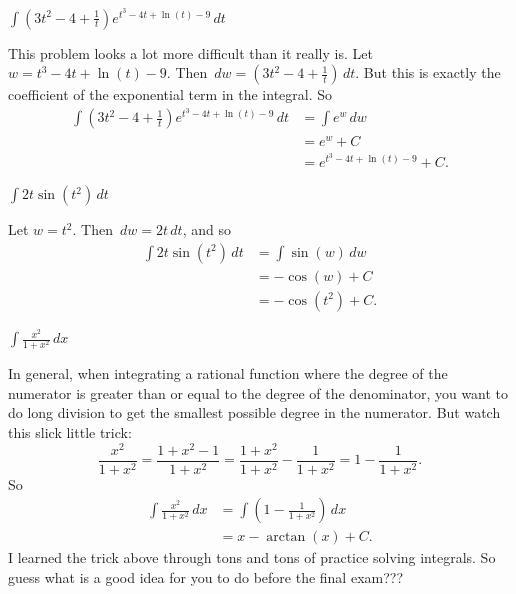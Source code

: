 \documentclass[nooutcomes]{ximera}
\renewenvironment{freeResponse}{
\ifhandout\setbox0\vbox\bgroup\else
\begin{trivlist}\item[\hskip \labelsep\bfseries Solution:\hspace{2ex}]
\fi}
{\ifhandout\egroup\else
\end{trivlist}
\fi}
\renewcommand{\d}{\,d}
\begin{document}
\begin{problem}
  $\int \left( 3t^2 - 4 + \frac{1}{t} \right) e^{t^3 - 4t + \ln(t) -
    9} \d t$
  \begin{freeResponse}
    This problem looks a lot more difficult than it really is.
    Let $w=t^3 - 4t + \ln(t) - 9$.
    Then $\d w = \left( 3t^2 - 4 + \frac{1}{t} \right) \d t$.
    But this is exactly the coefficient of the exponential term in the integral.
    So
    \begin{align*}
      \int \left( 3t^2 - 4 + \frac{1}{t} \right) e^{t^3 - 4t + \ln(t) - 9} \d t &= \int e^w \d w  \\                                                                           &= e^w + C  \\                                                                                &= e^{t^3 - 4t + \ln(t) - 9} + C.
    \end{align*}
  \end{freeResponse}
\end{problem}

\begin{problem}
$\int 2t \sin \left( t^2 \right) \d t$
  \begin{freeResponse}
    Let $w=t^2$.  Then $\d w = 2t \d t$, and so
    \begin{align*}
      \int 2t \sin(t^2) \d t &= \int \sin(w) \d w  \\
                             &= - \cos(w) + C  \\
                             &= - \cos(t^2) + C.
    \end{align*}
  \end{freeResponse}
\end{problem}

\begin{problem}
  $\int \frac{x^2 }{1 + x^2} \d x$
  \begin{freeResponse}
    In general, when integrating a rational function where the degree of the numerator is greater than or equal to the degree of the denominator, you want to do long division to get the smallest possible degree in the numerator.
    But watch this slick little trick:
    \begin{equation*}
      \frac{x^2}{1+x^2} = \frac{1 + x^2 - 1}{1+x^2} = \frac{1+x^2}{1+x^2} - \frac{1}{1+x^2} = 1 - \frac{1}{1+x^2}.
    \end{equation*}
    So
    \begin{align*}
      \int \frac{x^2 }{1 + x^2} \d x &= \int \left( 1 - \frac{1}{1+x^2} \right) \d x  \\                                     &= x - \arctan(x) + C.
    \end{align*}
    I learned the trick above through tons and tons of practice solving integrals.
    So guess what is a good idea for you to do before the final exam???
  \end{freeResponse}
\end{problem}
\end{document}
